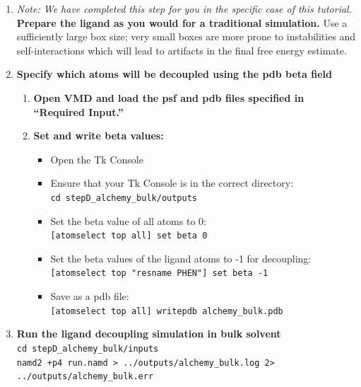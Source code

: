\documentclass[9pt,tutorial,pubversion]{Styling/livecoms}
\newcommand{\textInput}[1]{\texttt{#1}}
\begin{document}
    \begin{enumerate}
        \item \textit{Note: We have completed this step for you in the specific case of this tutorial.} \textbf{Prepare the ligand as you would for a traditional simulation.} Use a sufficiently large box size; very small boxes are more prone to instabilities and self-interactions which will lead to artifacts in the final free energy estimate. 
        \item \textbf{Specify which atoms will be decoupled using the pdb beta field}\label{step:makeFEPpdb} 
        \begin{enumerate}[label=\alph*., ref=\theenumi.\alph*]
            \item \textbf{Open VMD and load the psf and pdb files specified in ``Required Input.''}
            \item \textbf{Set and write beta values:}
            \begin{itemize}
                \item Open the Tk Console
                \item Ensure that your Tk Console is in the correct directory:\\
                \textInput{cd stepD\_alchemy\_bulk/outputs}
                \item Set the beta value of all atoms to 0:\\
                \textInput{[atomselect top all] set beta 0}
                \item Set the beta values of the ligand atoms to -1 for decoupling:\\
                \textInput{[atomselect top "resname PHEN"] set beta -1}
                \item Save as a pdb file:\\
                \textInput{[atomselect top all] writepdb alchemy\_bulk.pdb}
            \end{itemize}
        \end{enumerate}

        \item \textbf{Run the ligand decoupling simulation in bulk solvent}\\
        \textInput{cd stepD\_alchemy\_bulk/inputs}\\
        \textInput{namd2 +p4 run.namd > ../outputs/alchemy\_bulk.log 2> ../outputs/alchemy\_bulk.err}


\end{enumerate}
\end{document}
